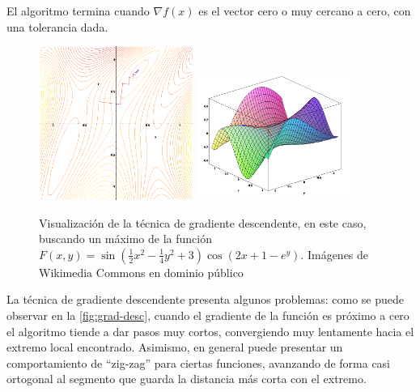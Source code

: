 El algoritmo termina cuando \(\nabla f(x)\) es el vector cero o muy
cercano a cero, con una tolerancia dada.

\begin{figure}[hbtp]
  \centering
  \includegraphics[width=0.45\textwidth]{images/gradient_ascent_contour.png}
  \includegraphics[width=0.45\textwidth]{images/gradient_ascent_surface.png}
  \caption{\label{fig:grad-desc}Visualización de la técnica de gradiente descendente, en este caso, buscando un máximo de la función $F(x,y)=\sin\left(\frac{1}{2} x^2 - \frac{1}{4} y^2 + 3 \right) \cos(2 x+1-e^y)$. Imágenes de Wikimedia Commons en dominio público}
\end{figure}

La técnica de gradiente descendente presenta algunos problemas: como se
puede observar en la \autoref{fig:grad-desc}, cuando el gradiente de
la función es próximo a cero el algoritmo tiende a dar pasos muy cortos,
convergiendo muy lentamente hacia el extremo local encontrado. Asimismo,
en general puede presentar un comportamiento de ``zig-zag'' para ciertas
funciones, avanzando de forma casi ortogonal al segmento que guarda la
distancia más corta con el extremo.
